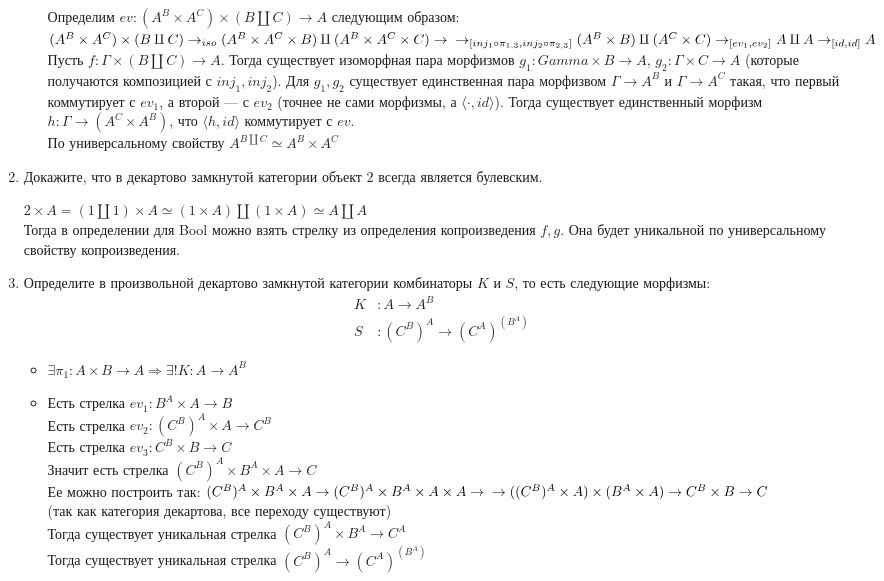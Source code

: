 \documentclass[draft]{article}
\begin{document}
\begin{enumerate}
\begin{enumerate}
Определим $ev: (A^B\times A^C)\times(B\amalg C) \to A$ следующим образом:\\
$(A^B\times A^C)\times(B\amalg C) \to_{iso} (A^B\times A^C \times B)\amalg (A^B\times A^C \times C) \to\\ \to_{[inj_1 \circ\pi_{1,3},inj_2 \circ \pi_{2,3}]} (A^B \times B)\amalg (A^C \times C) \to_{[ev_1, ev_2]} A \amalg A \to_{[id, id]} A$\\
Пусть $f : \Gamma \times (B\amalg C) \to A$. Тогда существует изоморфная пара морфизмов $g_1: Gamma\times B \to A$, $g_2:\Gamma \times C \to A$ (которые получаются композицией с $inj_1, inj_2$). Для $g_1, g_2$ существует единственная пара морфизвом $\Gamma \to A^B$ и $\Gamma \to A^C$ такая, что первый коммутирует с $ev_1$, а второй --- с $ev_2$ (точнее не сами морфизмы, а $\langle \cdot, id\rangle$). Тогда существует единственный морфизм $h: \Gamma \to (A^C\times A^B)$, что $\langle h, id\rangle$ коммутирует с  $ev$.\\
По универсальному свойству $A^{B\amalg C} \simeq A^B\times A^C$

\end{enumerate}


\item Докажите, что в декартово замкнутой категории объект $2$ всегда является булевским.

$2 \times A = (1 \amalg 1)\times A \simeq
(1 \times A)\amalg (1 \times A) \simeq A\amalg A$\\
Тогда в определении для Bool можно взять стрелку из определения копроизведения $f, g$. Она будет уникальной по универсальному свойству копроизведения.

\item Определите в произвольной декартово замкнутой категории комбинаторы $K$ и $S$, то есть следующие морфизмы:
\begin{align*}
K & : A \to A^B \\ 
S & : (C^B)^A \to (C^A)^{(B^A)}
\end{align*}
\begin{itemize}
\item
$ \exists \pi_1 : A \times B \to A \Rightarrow \exists! K : A \to A^B $
\item
Есть стрелка $ev_1: B^A\times A \to B$\\
Есть стрелка $ev_2: (C^B)^A \times A \to C^B$\\
Есть стрелка $ev_3: C^B \times B \to C$\\
Значит есть стрелка $(C^B)^A \times B^A \times A \to C$\\
Ее можно построить так: $(C^B)^A \times B^A \times A \to (C^B)^A \times B^A \times A\times A \to\\
\to ((C^B)^A\times A) \times (B^A \times A) \to C^B \times B \to C$\\
(так как категория декартова, все переходу существуют)\\
Тогда существует уникальная стрелка $(C^B)^A \times B^A \to C^A$\\
Тогда существует уникальная стрелка $(C^B)^A \to (C^A)^{(B^A )}$
\end{itemize}


\end{enumerate}
\end{document}
